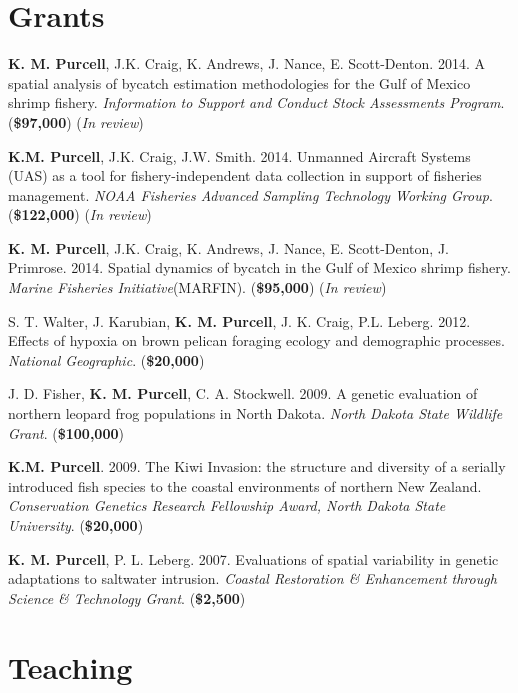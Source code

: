 \documentclass[letterpaper]{article}
\renewenvironment{itemize}{
  \begin{list}{}{
    \setlength{\leftmargin}{1em}
  }
}{
  \end{list}
}
\begin{document}
\section*{Grants}
	\begin{itemize}
		 \item \textbf{K. M. Purcell}, J.K. Craig, K. Andrews, J. Nance, E. Scott-Denton. 2014. A spatial analysis of bycatch estimation methodologies for the Gulf of Mexico shrimp fishery. \textit{Information to Support and Conduct Stock Assessments Program}. (\textbf{\$97,000}) (\textit{In review})
		 \item \textbf{K.M. Purcell}, J.K. Craig, J.W. Smith.  2014.  Unmanned Aircraft Systems (UAS) as a tool for fishery-independent data collection in support of fisheries management.  \textit{NOAA Fisheries Advanced Sampling Technology Working Group}. (\textbf{\$122,000}) (\textit{In review})
		 \item \textbf{K. M. Purcell}, J.K. Craig, K. Andrews, J. Nance, E. Scott-Denton, J. Primrose. 2014. Spatial dynamics of bycatch in the Gulf of Mexico shrimp fishery. \textit{Marine Fisheries Initiative}(MARFIN). (\textbf{\$95,000}) (\textit{In review})
		 \item S. T. Walter, J. Karubian, \textbf{K. M. Purcell}, J. K. Craig, P.L. Leberg. 2012. Effects of hypoxia on brown pelican foraging ecology and demographic processes. \textit{National Geographic}. (\textbf{\$20,000})
		 \item J. D. Fisher, \textbf{K. M. Purcell}, C. A. Stockwell. 2009. A genetic evaluation of northern leopard frog populations in North Dakota. \textit{North Dakota State Wildlife Grant}. (\textbf{\$100,000})
		 \item \textbf{K.M. Purcell}. 2009. The Kiwi Invasion: the structure and diversity of a serially introduced fish species to the coastal environments of northern New Zealand. \textit{Conservation Genetics Research Fellowship Award, North Dakota State University}. (\textbf{\$20,000})
     
		 \item \textbf{K. M. Purcell}, P. L. Leberg. 2007. Evaluations of spatial variability in genetic adaptations to saltwater intrusion. \textit{Coastal Restoration & Enhancement through Science & Technology Grant}. (\textbf{\$2,500})
	\end{itemize}

\section*{Teaching}
\end{document}

